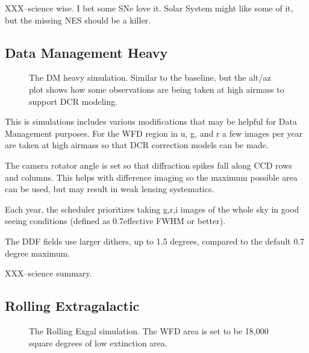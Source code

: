 XXX--science wise. I bet some SNe love it. Solar System might like some of it, but the missing NES should be a killer.

\subsection{Data Management Heavy}

\begin{figure}
\caption{The DM heavy simulation. Similar to the baseline, but the alt/az plot shows how some observations are being taken at high airmass to support DCR modeling.}\label{fig:dmheavy}
\end{figure}


This is simulations includes various modifications that may be helpful for Data Management purposes. For the WFD region in u, g, and r a few images per year are taken at high airmass so that DCR correction models can be made.

The camera rotator angle is set so that diffraction spikes fall along CCD rows and columns. This helps with difference imaging so the maximum possible area can be used, but may result in weak lensing systematics.

Each year, the scheduler prioritizes taking g,r,i images of the whole sky in good seeing conditions (defined as 0.7\arcsec effective FWHM or better).

The DDF fields use larger dithers, up to 1.5 degrees, compared to the default 0.7 degree maximum.


XXX--science summary. 

\subsection{Rolling Extragalactic}

\begin{figure}
\caption{The Rolling Exgal simulation. The WFD area is set to be 18,000 square degrees of low extinction area.}\label{fig:rollingexgal}
\end{figure}



